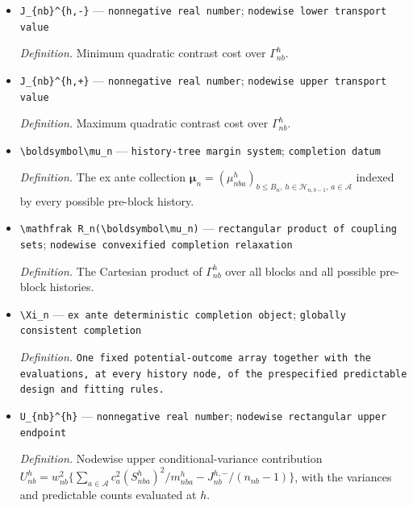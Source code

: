 \documentclass{article}
\begin{document}
\begin{itemize}
  \par\smallskip\noindent\emph{Definition.} The set \(\Gamma(\mu_{nb1}^{h},\ldots,\mu_{nbK}^{h})\) of convexified joint residual laws at node \(h\).
  \item \texttt{J\_\allowbreak{}\{nb\}\allowbreak{}\textasciicircum{}\{h,\allowbreak{}-\allowbreak{}\}\allowbreak{}} --- \texttt{nonnegative real number}; \texttt{nodewise lower transport value}
  \par\smallskip\noindent\emph{Definition.} Minimum quadratic contrast cost over \(\Gamma_{nb}^{h}\).
  \item \texttt{J\_\allowbreak{}\{nb\}\allowbreak{}\textasciicircum{}\{h,\allowbreak{}+\allowbreak{}\}\allowbreak{}} --- \texttt{nonnegative real number}; \texttt{nodewise upper transport value}
  \par\smallskip\noindent\emph{Definition.} Maximum quadratic contrast cost over \(\Gamma_{nb}^{h}\).
  \item \texttt{\textbackslash{}\allowbreak{}boldsymbol\textbackslash{}\allowbreak{}mu\_\allowbreak{}n} --- \texttt{history-\allowbreak{}tree margin system}; \texttt{completion datum}
  \par\smallskip\noindent\emph{Definition.} The ex ante collection \(\boldsymbol\mu_n=(\mu_{nba}^{h})_{b\le B_n,\,h\in\mathcal H_{n,b-1},\,a\in\mathcal A}\) indexed by every possible pre-block history.
  \item \texttt{\textbackslash{}\allowbreak{}mathfrak R\_\allowbreak{}n(\textbackslash{}\allowbreak{}boldsymbol\textbackslash{}\allowbreak{}mu\_\allowbreak{}n)} --- \texttt{rectangular product of coupling sets}; \texttt{nodewise convexified completion relaxation}
  \par\smallskip\noindent\emph{Definition.} The Cartesian product of \(\Gamma_{nb}^{h}\) over all blocks and all possible pre-block histories.
  \item \texttt{\textbackslash{}\allowbreak{}Xi\_\allowbreak{}n} --- \texttt{ex ante deterministic completion object}; \texttt{globally consistent completion}
  \par\smallskip\noindent\emph{Definition.} \texttt{One fixed potential-\allowbreak{}outcome array together with the evaluations,\allowbreak{} at every history node,\allowbreak{} of the prespecified predictable design and fitting rules.}
  \item \texttt{U\_\allowbreak{}\{nb\}\allowbreak{}\textasciicircum{}\{h\}\allowbreak{}} --- \texttt{nonnegative real number}; \texttt{nodewise rectangular upper endpoint}
  \par\smallskip\noindent\emph{Definition.} Nodewise upper conditional-variance contribution \(U_{nb}^{h}=w_{nb}^2\{\sum_{a\in\mathcal A}c_a^2(S_{nba}^{h})^2/m_{nba}^{h}-J_{nb}^{h,-}/(n_{nb}-1)\}\), with the variances and predictable counts evaluated at \(h\).

\end{itemize}
\end{document}
